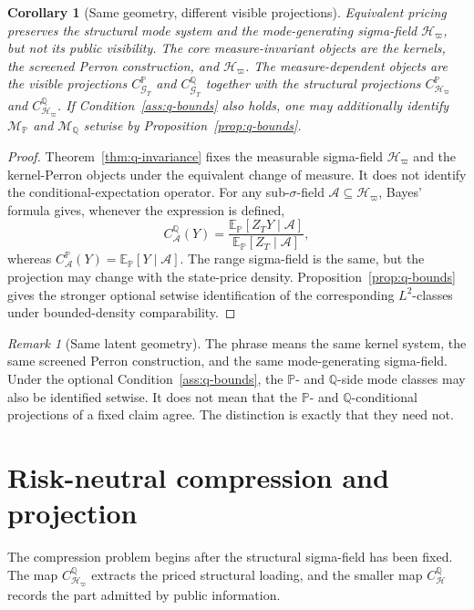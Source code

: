 \documentclass[11pt,a4paper]{amsart}
\theoremstyle{plain}
\newtheorem{corollary}[theorem]{Corollary}
\theoremstyle{definition}
\theoremstyle{remark}
\newtheorem{remark}[theorem]{Remark}
\newcommand{\PP}{\mathbb{P}}
\newcommand{\QQ}{\mathbb{Q}}
\newcommand{\EE}{\mathbb{E}}
\newcommand{\cA}{\mathcal{A}}
\newcommand{\cG}{\mathcal{G}}
\newcommand{\cH}{\mathcal{H}}
\newcommand{\cM}{\mathcal{M}}
\begin{document}
\begin{corollary}[Same geometry, different visible projections]\label{cor:same-geometry}
Equivalent pricing preserves the structural mode system and the mode-generating sigma-field
\(\cH_\varpi\), but not its public visibility.  The core measure-invariant objects are the
kernels, the screened Perron construction, and \(\cH_\varpi\).  The measure-dependent objects are
the visible projections \(C_{\cG_T}^{\PP}\) and \(C_{\cG_T}^{\QQ}\) together with the structural
projections \(C_{\cH_\varpi}^{\PP}\) and \(C_{\cH_\varpi}^{\QQ}\).  If
Condition~\ref{ass:q-bounds} also holds, one may additionally identify \(\cM_\PP\) and
\(\cM_\QQ\) setwise by Proposition~\ref{prop:q-bounds}.
\end{corollary}


\begin{proof}
Theorem~\ref{thm:q-invariance} fixes the measurable sigma-field
\(\cH_\varpi\) and the kernel-Perron objects under the equivalent change of measure.  It does not
identify the conditional-expectation operator.  For any sub-\(\sigma\)-field
\(\cA\subseteq\cH_\varpi\), Bayes' formula gives, whenever the expression is defined,
\[
        C_{\cA}^{\QQ}(Y)
        =
        \frac{\EE_\PP[Z_TY\mid\cA]}{\EE_\PP[Z_T\mid\cA]},
\]
whereas \(C_{\cA}^{\PP}(Y)=\EE_\PP[Y\mid\cA]\).  The range sigma-field is the same, but the
projection may change with the state-price density.  Proposition~\ref{prop:q-bounds} gives the
stronger optional setwise identification of the corresponding \(L^2\)-classes under bounded-density
comparability.
\end{proof}

\begin{remark}[Same latent geometry]
The phrase means the same kernel system, the same screened Perron construction, and the same
mode-generating sigma-field.  Under the optional Condition~\ref{ass:q-bounds}, the \(\PP\)- and
\(\QQ\)-side mode classes may also be identified setwise.  It does not mean that the \(\PP\)- and
\(\QQ\)-conditional projections of a fixed claim agree.  The distinction is exactly that they need
not.
\end{remark}

\section{Risk-neutral compression and projection}\label{sec:compression}

The compression problem begins after the structural sigma-field has been fixed.  The map
\(C_{\cH_\varpi}^{\QQ}\) extracts the priced structural loading, and the smaller map
\(C_{\cH}^{\QQ}\) records the part admitted by public information.
\end{document}
